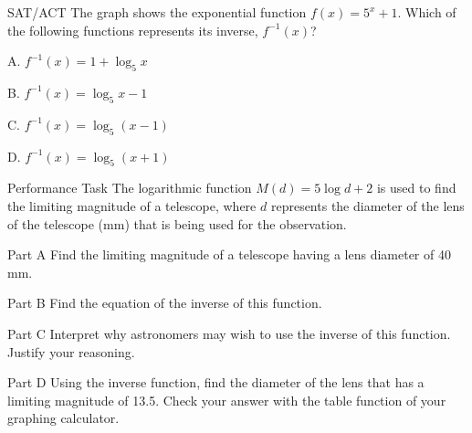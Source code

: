 \documentclass{article}
\newenvironment{practice}[2]{}{}        %
\newcommand{\answer}[1]{}               %
\newcommand{\uncertain}[2]{#1}          %
\begin{document}
\begin{practice}{32}{\uncertain{not listed}{not included in Item Analysis table}}
SAT/ACT The graph shows the exponential function $f(x)=5^x+1$. Which of the following functions represents its inverse, $f^{-1}(x)$?

\begin{center}
\end{center}

A. $f^{-1}(x)=1+\log_5x$

B. $f^{-1}(x)=\log_5x-1$

C. $f^{-1}(x)=\log_5(x-1)$

D. $f^{-1}(x)=\log_5(x+1)$

\answer{C. $f^{-1}(x)=\log_5(x-1)$}
\end{practice}

\begin{practice}{33}{\uncertain{not listed}{not included in Item Analysis table}}
Performance Task The logarithmic function $M(d)=5\log d+2$ is used to find the limiting magnitude of a telescope, where $d$ represents the diameter of the lens of the telescope (mm) that is being used for the observation.

Part A Find the limiting magnitude of a telescope having a lens diameter of 40 mm.

Part B Find the equation of the inverse of this function.

Part C Interpret why astronomers may wish to use the inverse of this function. Justify your reasoning.

Part D Using the inverse function, find the diameter of the lens that has a limiting magnitude of 13.5. Check your answer with the table function of your graphing calculator.

\answer{A. magnitude 10.

B. $d=10^{\frac{M-2}{5}}$.

C. Astronomers can use this function when the limiting magnitude of a telescope is known to find the diameter of the lens of the telescope.

D. $199.5$ mm.}
\end{practice}
\end{document}
